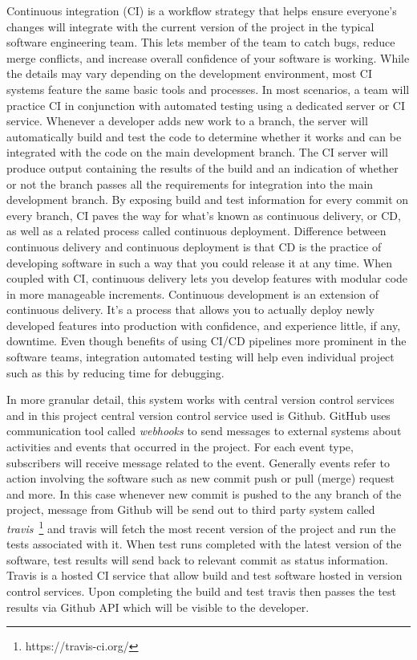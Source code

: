 Continuous integration (CI) is a workflow strategy that helps ensure everyone's changes will integrate with the current version of the project in the typical software engineering team. This lets member of the team to catch bugs, reduce merge conflicts, and increase overall confidence of your software is working. While the details may vary depending on the development environment, most CI systems feature the same basic tools and processes. In most scenarios, a team will practice CI in conjunction with automated testing using a dedicated server or CI service. Whenever a developer adds new work to a branch, the server will automatically build and test the code to determine whether it works and can be integrated with the code on the main development branch. The CI server will produce output containing the results of the build and an indication of whether or not the branch passes all the requirements for integration into the main development branch. By exposing build and test information for every commit on every branch, CI paves the way for what's known as continuous delivery, or CD, as well as a related process called continuous deployment. Difference between continuous delivery and continuous deployment is that CD is the practice of developing software in such a way that you could release it at any time. When coupled with CI, continuous delivery lets you develop features with modular code in more manageable increments. Continuous development is an extension of continuous delivery. It's a process that allows you to actually deploy newly developed features into production with confidence, and experience little, if any, downtime. Even though benefits of using CI/CD pipelines more prominent in the software teams, integration automated testing will help even individual project such as this by reducing time for debugging.

In more granular detail, this system works with central version control services and in this project central version control service used is Github. GitHub uses communication tool called \emph{webhooks} to send messages to external systems about activities and events that occurred in the project. For each event type, subscribers will receive message related to the event. Generally events refer to action involving the software such as new commit push or pull (merge) request and more. In this case whenever new commit is pushed to the any branch of the project, message from Github will be send out to third party system called \emph{travis}~\footnote{https://travis-ci.org/} and travis will fetch the most recent version of the project and run the tests associated with it. When test runs completed with the latest version of the software, test results will send back to relevant commit as status information. Travis is a hosted CI service that allow build and test software hosted in version control services. Upon completing the build and test travis then passes the test results via Github API which will be visible to the developer. 

